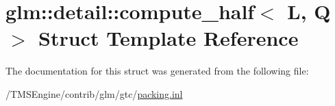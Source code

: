 \hypertarget{structglm_1_1detail_1_1compute__half}{}\section{glm\+:\+:detail\+:\+:compute\+\_\+half$<$ L, Q $>$ Struct Template Reference}
\label{structglm_1_1detail_1_1compute__half}


The documentation for this struct was generated from the following file\+:\begin{DoxyCompactItemize}
\item 
/\+T\+M\+S\+Engine/contrib/glm/gtc/\hyperlink{packing_8inl}{packing.\+inl}\end{DoxyCompactItemize}
